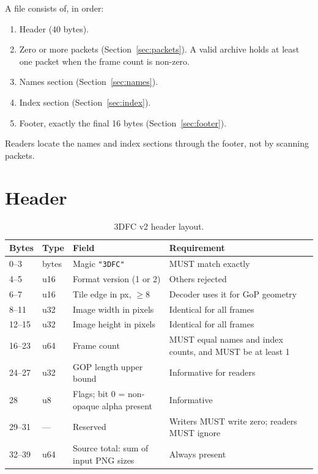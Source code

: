 \documentclass[11pt,a4paper]{article}
\begin{document}
A file consists of, in order:

\begin{enumerate}
\item Header (40 bytes).
\item Zero or more packets (Section~\ref{sec:packets}). A valid archive holds
at least one packet when the frame count is non-zero.
\item Names section (Section~\ref{sec:names}).
\item Index section (Section~\ref{sec:index}).
\item Footer, exactly the final 16 bytes (Section~\ref{sec:footer}).
\end{enumerate}

Readers locate the names and index sections through the footer, not by
scanning packets.

\section{Header}

\begin{table}[h]
\centering
\begin{tabular}{@{}llll@{}}
\toprule
Bytes & Type & Field & Requirement \\
\midrule
0--3   & bytes & Magic \texttt{"3DFC"} & MUST match exactly \\
4--5   & u16   & Format version (1 or 2) & Others rejected \\
6--7   & u16   & Tile edge in px, $\ge 8$ & Decoder uses it for GoP geometry \\
8--11  & u32   & Image width in pixels & Identical for all frames \\
12--15 & u32   & Image height in pixels & Identical for all frames \\
16--23 & u64   & Frame count & MUST equal names and index counts, and MUST be at least 1 \\
24--27 & u32   & GOP length upper bound & Informative for readers \\
28     & u8    & Flags; bit 0 = non-opaque alpha present & Informative \\
29--31 & ---   & Reserved & Writers MUST write zero; readers MUST ignore \\
32--39 & u64   & Source total: sum of input PNG sizes & Always present \\
\bottomrule
\end{tabular}
\caption{3DFC v2 header layout.}
\label{tab:header}
\end{table}
\end{document}

